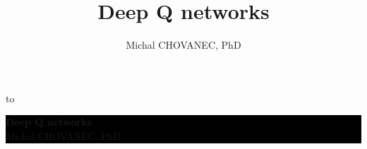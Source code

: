 \documentclass[xcolor=dvipsnames]{beamer}
\title{\color{white} \bf Deep Q networks}
\author{\color{white} Michal CHOVANEC, PhD}
\date[EURP]{}
\begin{document}
{
    \usebackgroundtemplate
    {
        \vbox to 
    }
    \begin{frame}



    \centering
     \colorbox{black}
     {
        \begin{minipage}{7cm}
           {\LARGE \color{white} \bf Deep Q networks} \\
           {\LARGE \color{white} Michal CHOVANEC, PhD} \\
       \end{minipage}
     }


    \end{frame}
}
\end{document}
